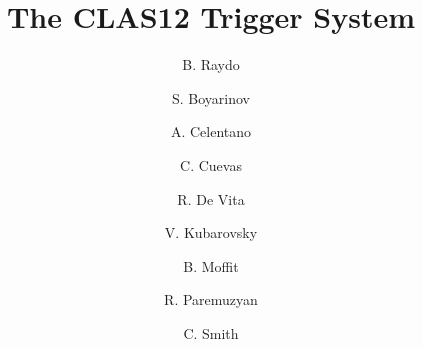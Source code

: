 \title{The CLAS12 Trigger System}

\author[A]{B. Raydo}
\author[A]{S. Boyarinov}
\author[B]{A. Celentano}
\author[A]{C. Cuevas}
\author[B]{R. De Vita}
\author[A]{V. Kubarovsky}
\author[A]{B. Moffit}
\author[A]{R. Paremuzyan}
\author[A]{C. Smith}

\address[A]{Thomas Jefferson National Accelerator Facility, Newport News, VA, USA}
\address[B]{INFN, Milan, Italy}
